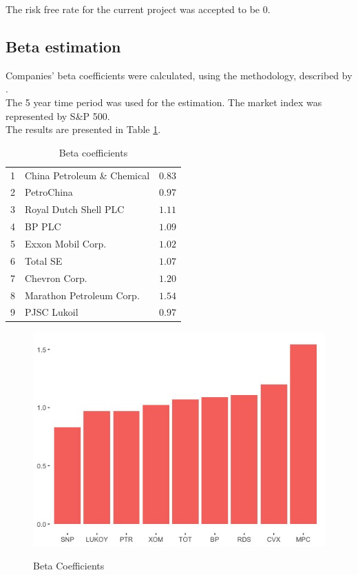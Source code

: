 \documentclass [a4paper, 11pt] {article}
\begin{document}
The risk free rate for the current project was accepted to be 0.

\clearpage
\subsection {Beta estimation}

Companies' beta coefficients were calculated, using the methodology, described by \cite{Casey}.\\
The 5 year time period was used for the estimation. The market index was represented by S\&P 500.\\
The results are presented in Table \ref{tab:beta}.\\

\begin{table}[!h]
\caption{Beta coefficients\label{beta}} 
\begin{center}
\begin{tabular}{llr}
\hline\hline
1&China Petroleum \& Chemical&$0.83$\tabularnewline
2&PetroChina&$0.97$\tabularnewline
3&Royal Dutch Shell PLC&$1.11$\tabularnewline
4&BP PLC&$1.09$\tabularnewline
5&Exxon Mobil Corp.&$1.02$\tabularnewline
6&Total SE&$1.07$\tabularnewline
7&Chevron Corp.&$1.20$\tabularnewline
8&Marathon Petroleum Corp.&$1.54$\tabularnewline
9&PJSC Lukoil&$0.97$\tabularnewline
\hline
\end{tabular}\end{center}
\label{tab:beta}
\end{table}

\begin{figure}[!h]
\caption{Beta Coefficients}
\includegraphics[scale=0.65]{beta_plot_bars}
\label{fig:beta}
\end{figure}
\end{document}
